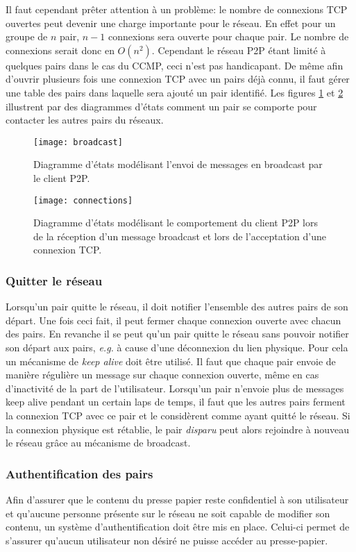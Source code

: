 Il faut cependant prêter attention à un
problème: le nombre de connexions TCP ouvertes peut devenir une charge
importante pour le réseau. En effet pour un groupe de $n$ pair, $n-1$
connexions sera ouverte pour chaque pair. Le nombre de connexions serait donc
en $O(n^2)$. Cependant le réseau P2P étant limité à quelques pairs dans le
cas du CCMP, ceci n'est pas handicapant.
De même afin d'ouvrir plusieurs fois une connexion TCP avec un pairs déjà
connu, il faut gérer une table des pairs dans laquelle sera ajouté un
pair identifié. Les figures \ref{fig:broadcast} et \ref{fig:connections}
illustrent par des diagrammes d'états comment un pair se comporte pour
contacter les autres pairs du réseaux.

\begin{figure}[!h]
  \centering
  \texttt{[image: broadcast]}
  \caption{Diagramme d'états modélisant l'envoi de messages en broadcast
    par le client P2P.}
  \label{fig:broadcast}
\end{figure}

\begin{figure}[!h]
  \centering
  \texttt{[image: connections]}
  \caption{Diagramme d'états modélisant le comportement du client P2P lors
    de la réception d'un message broadcast et lors de l'acceptation d'une
    connexion TCP.}
  \label{fig:connections}
\end{figure}

\subsubsection{Quitter le réseau}
Lorsqu'un pair quitte le réseau, il doit notifier l'ensemble des autres
pairs de son départ. Une fois ceci fait, il peut fermer chaque connexion
ouverte avec chacun des pairs. En revanche il se peut qu'un pair quitte
le réseau sans pouvoir notifier son départ aux pairs, \emph{e.g.}
à cause d'une déconnexion du lien physique. Pour cela un mécanisme
de \emph{keep alive} doit être utilisé. Il faut que chaque pair envoie
de manière régulière un message sur chaque connexion ouverte, même en cas
d'inactivité de la part de l'utilisateur. Lorsqu'un pair n'envoie plus
de messages keep alive pendant un certain laps de temps, il faut que les
autres pairs ferment la connexion TCP avec ce pair et le considèrent comme
ayant quitté le réseau. Si la connexion physique est rétablie, le pair
\emph{disparu} peut alors rejoindre à nouveau le réseau grâce au mécanisme
de broadcast.

\subsubsection{Authentification des pairs}
Afin d'assurer que le contenu du presse papier reste confidentiel à son
utilisateur et qu'aucune personne présente sur le réseau ne soit capable de
modifier son contenu, un système d'authentification doit être mis en place.
Celui-ci permet de s'assurer qu'aucun utilisateur non désiré ne puisse accéder
au presse-papier.

